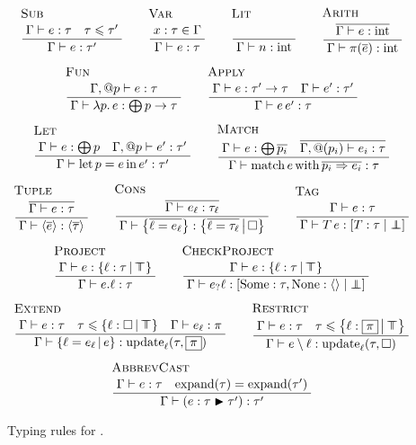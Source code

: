 \begin{figure}[t]
    \centering
\begin{gather*}
\irule{Sub}
    {\Gamma \vdash e : \tau \quad \tau \sub \tau'}
    {\Gamma \vdash e : \tau'}
\quad
\irule{Var}
    {x : \tau \in \Gamma}
    {\Gamma \vdash e : \tau}
\quad
\irule{Lit}
    {}
    {\Gamma \vdash n : \sint}
\quad
\irule{Arith}
    {\overline{\Gamma \vdash e : \sint}}
    {\Gamma \vdash \pi(\overline e) : \sint}
\\
\irule{Fun}{\Gamma, @p \vdash e : \tau}{\Gamma \vdash \fllam p e : \bigoplus p \to \tau}
\quad
\irule{Apply}
    {\Gamma \vdash e : \tau' \to \tau \quad \Gamma \vdash e' : \tau'}
    {\Gamma \vdash e\,e' : \tau}
\\
\irule{Let}{\Gamma \vdash e : \bigoplus p \quad \Gamma, @p \vdash e' : \tau'}{\Gamma \vdash \fllet p e e' : \tau'}
\quad
\irule{Match}{\Gamma \vdash e : \bigoplus \overline{p_i} \quad  \overline{\Gamma, @(p_i) \vdash e_i : \tau}}{\Gamma \vdash \fbmatch{e} \overline{p_i \Rightarrow e_i} : \tau}
\\
\irule{Tuple}
    {\overline{\Gamma \vdash e : \tau}}
    {\Gamma \vdash \fbtuple{\overline e} : \fbtuple{\overline \tau}}
\quad
\irule{Cons}
    {\overline{\Gamma \vdash e_\ell : \tau_\ell}}
    {\Gamma \vdash \flrec{\overline{\ell = e_\ell}} : \flext{\overline{\ell = \tau_\ell}}{\flabsent}}
\quad
\irule{Tag}
    {\Gamma \vdash e : \tau}
    {\Gamma \vdash T\,e : \fbvar{T : \tau}{\flfbot}}
\\
\irule{Project}
    {\Gamma \vdash e : \flext{\ell : \tau}{\flftop}}
    {\Gamma \vdash \flproj e \ell : \tau}
\quad
\irule{CheckProject}
    {\Gamma \vdash e : \flext{\ell : \tau}{\flftop}}
    {\Gamma \vdash \fbcheck e \ell : \fbvar{\mathrm{Some}: \tau, \mathrm{None}: \fbtuple{}}{\flfbot}}
\\
\irule{Extend}
    {\Gamma \vdash e : \tau \quad \tau \sub \flext{\ell : \flabsent}{\flftop} \quad \Gamma \vdash e_\ell : \pi}
    {\Gamma \vdash \flext{\ell = e_\ell}{e} : \mathrm{update}_\ell(\tau, \flpresent{\pi})}
\quad
\irule{Restrict}
    {\Gamma \vdash e : \tau \quad \tau \sub \flext{\ell : \flpresent {\pi}}{\flftop}}
    {\Gamma \vdash e \fbrestricted \ell : \mathrm{update}_\ell(\tau, \flabsent)}
\\
\irule{AbbrevCast}
    {\Gamma \vdash e : \tau \quad \mathrm{expand}(\tau) = \mathrm{expand}(\tau')}
    {\Gamma \vdash (\fbcast{e}{\tau}{\tau'}) : \tau'}
\end{gather*}
    \caption{Typing rules for \fabric{}.}
    \label{fig:fabric-typing}
\end{figure}

